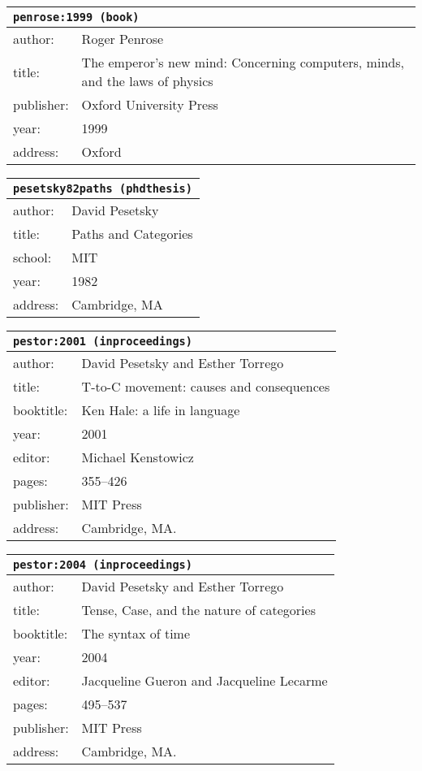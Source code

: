 \documentclass{article}
\begin{document}
\bigskip

\begin{tabular}{p{}p{}}
\multicolumn{2}{l}{\texttt{penrose:1999 (book)}}\\
\hline
author: & Roger Penrose\\
title: & The emperor's new mind: Concerning computers, minds, and the laws of physics\\
publisher: & Oxford University Press\\
year: & 1999\\
address: & Oxford\\
\end{tabular}

\bigskip

\begin{tabular}{p{}p{}}
\multicolumn{2}{l}{\texttt{pesetsky82paths (phdthesis)}}\\
\hline
author: & David Pesetsky\\
title: & Paths and Categories\\
school: & MIT\\
year: & 1982\\
address: & Cambridge, MA\\
\end{tabular}

\bigskip

\begin{tabular}{p{}p{}}
\multicolumn{2}{l}{\texttt{pestor:2001 (inproceedings)}}\\
\hline
author: & David Pesetsky and Esther Torrego\\
title: & T-to-C movement: causes and consequences\\
booktitle: & Ken Hale: a life in language\\
year: & 2001\\
editor: & Michael Kenstowicz\\
pages: & 355--426\\
publisher: & MIT Press\\
address: & Cambridge, MA.\\
\end{tabular}

\bigskip

\begin{tabular}{p{}p{}}
\multicolumn{2}{l}{\texttt{pestor:2004 (inproceedings)}}\\
\hline
author: & David Pesetsky and Esther Torrego\\
title: & Tense, Case, and the nature of categories\\
booktitle: & The syntax of time\\
year: & 2004\\
editor: & Jacqueline Gueron and {Jacqueline Lecarme}\\
pages: & 495--537\\
publisher: & MIT Press\\
address: & Cambridge, MA.\\
\end{tabular}
\end{document}
